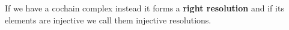 \documentclass[12pt]{article}
\numberwithin{equation}{section}
\newtheorem{definition}{Definition}[section]
\newtheorem{proposition}{Proposition}[section]
\begin{document}
\begin{appendices}
	If we have a cochain complex instead it forms a \textbf{right resolution} and if its elements are injective we call them injective resolutions.
	
%	
%	
%	
%	
%	
%	
%		
%		
%	
%	
%	
%	
	

\end{appendices}
\end{document}

